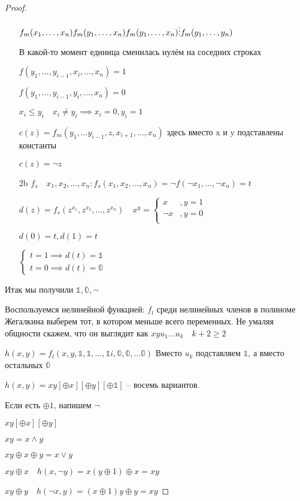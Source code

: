 \documentclass{book}
\theoremstyle{definition}
\begin{document}
\begin{proof}
\begin{itemize}
                $f_m(x_1, \ldots, x_{n} )\\f_m(y_1, \ldots, x_{n} )\\f_m(y_1, \ldots, x_{n} )\\ \vdots\\ f_m(y_1, \ldots, y_{n} )$

                В какой-то момент единица сменилась нулём на соседних строках

                $f(y_1, \ldots, y_{i-1}, x_i, \ldots, x_{n} )=1$

                $f(y_1, \ldots, y_{i-1}, y_i, \ldots, x_{n} )=0$

                $x_i\leqslant y_i\quad x_i\neq y_i \implies x_i = 0, y_i = 1$

                $c(z) = f_m(y_1, \ldots y_{i-1}, z, x_{i+1}, \ldots, x_{n} )$ здесь вместо x и y подставлены константы

                $c(z) = \neg z$
            \item [2b] $f_s\quad x_1, x_2, \ldots, x_{n} : f_s(x_1, x_2, \ldots, x_{n} ) = \neg f(\neg x_1, \ldots, \neg x_{n} ) = t$

                $d(z) = f_s(z^{x_1}, z^{x_2}, \ldots, z^{x_{n} })\quad x^y = \begin{cases}
                    x&, y=1\\
                    \neg x&, y= 0 \\
                \end{cases}$

                $d(0) = t, d(1) = t$

                $\begin{cases}
                    t=1 \implies d(t) = \mathbb{1}\\
                    t=0 \implies d(t) = \mathbb{0}
                \end{cases}$
        \end{itemize}
        Итак мы получили $\mathbb{1,0},\neg$

        Воспользуемся нелинейной функцией: $f_l$ среди нелинейных членов в полиноме Жегалкина выберем тот, в котором меньше всего переменных. Не умаляя общности скажем, что он выглядит как $xyu_1\dots u_k\quad k+2\geqslant 2$

        $h(x,y) = f_l(x,y,\mathbb{1}, \mathbb{1}, \ldots, \mathbb{1}i, \mathbb{0}, \mathbb{0}, \ldots\mathbb{0})$ Вместо $u_k$ подставляем $\mathbb{1}$, а вместо остальных $\mathbb{0}$

        $h(x,y)= xy[\oplus x][\oplus y][\oplus \mathbb{1}]$ -- восемь вариантов.

        Если есть $\oplus 1$, напишем $\neg$

        $xy[\oplus x][\oplus y]$       

        $xy = x\land y$

        $xy\oplus x\oplus y = x\lor y$

        $xy\oplus x\quad h(x,\neg y) = x(y\oplus 1)\oplus x = xy$

        $xy\oplus y\quad h(\neg x, y) = (x\oplus 1)y\oplus y = xy$
    \end{proof}
\end{document}
